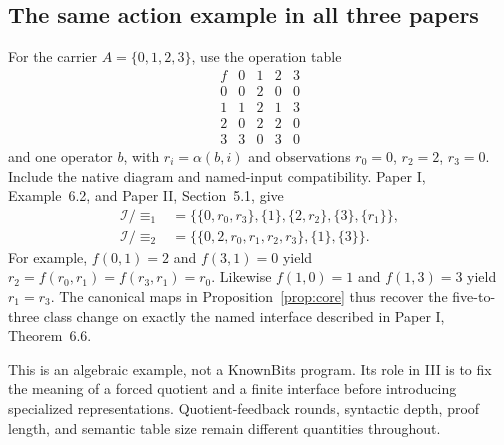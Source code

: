 \subsection{The same action example in all three papers}
For the carrier $A=\{0,1,2,3\}$, use the operation table
\[
\begin{array}{c|rrrr}
f&0&1&2&3\\\hline
0&0&2&0&0\\1&1&2&1&3\\2&0&2&2&0\\3&3&0&3&0
\end{array}
\]
and one operator $b$, with $r_i=\alpha(b,i)$ and observations $r_0=0$, $r_2=2$, $r_3=0$. Include the native diagram and named-input compatibility. Paper I, Example~6.2, and Paper II, Section~5.1, give
\begin{align*}
\mathcal I/{\equiv_1}&=
\{\{0,r_0,r_3\},\{1\},\{2,r_2\},\{3\},\{r_1\}\},\\
\mathcal I/{\equiv_2}&=
\{\{0,2,r_0,r_1,r_2,r_3\},\{1\},\{3\}\}.
\end{align*}
For example, $f(0,1)=2$ and $f(3,1)=0$ yield
$r_2=f(r_0,r_1)=f(r_3,r_1)=r_0$.
Likewise $f(1,0)=1$ and $f(1,3)=3$ yield $r_1=r_3$.
The canonical maps in Proposition~\ref{prop:core} thus recover the five-to-three class change on exactly the named interface described in Paper I, Theorem~6.6.

This is an algebraic example, not a KnownBits program. Its role in III is to fix the meaning of a forced quotient and a finite interface before introducing specialized representations. Quotient-feedback rounds, syntactic depth, proof length, and semantic table size remain different quantities throughout.
